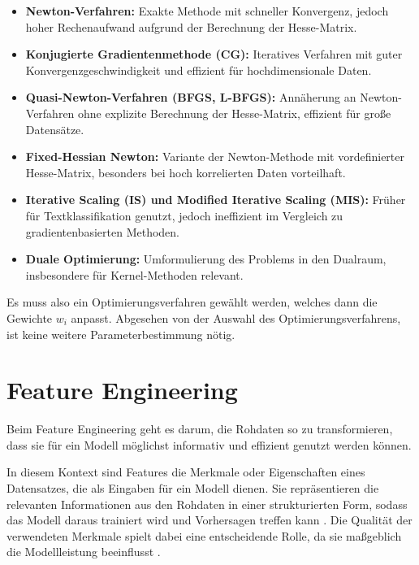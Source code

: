 \begin{itemize}[noitemsep]
    \item \textbf{Newton-Verfahren:} Exakte Methode mit schneller Konvergenz, jedoch hoher Rechenaufwand aufgrund der Berechnung der Hesse-Matrix.
    \item \textbf{Konjugierte Gradientenmethode (CG):} Iteratives Verfahren mit guter Konvergenzgeschwindigkeit und effizient für hochdimensionale Daten.
    \item \textbf{Quasi-Newton-Verfahren (BFGS, L-BFGS):} Annäherung an Newton-Verfahren ohne explizite Berechnung der Hesse-Matrix, effizient für große Datensätze.
    \item \textbf{Fixed-Hessian Newton:} Variante der Newton-Methode mit vordefinierter Hesse-Matrix, besonders bei hoch korrelierten Daten vorteilhaft.
    \item \textbf{Iterative Scaling (IS) und Modified Iterative Scaling (MIS):} Früher für Textklassifikation genutzt, jedoch ineffizient im Vergleich zu gradientenbasierten Methoden.
    \item \textbf{Duale Optimierung:} Umformulierung des Problems in den Dualraum, insbesondere für Kernel-Methoden relevant.
\end{itemize}

Es muss also ein Optimierungsverfahren gewählt werden, welches dann die Gewichte \(w_i\) anpasst.
Abgesehen von der Auswahl des Optimierungsverfahrens, ist keine weitere Parameterbestimmung nötig.

\section{Feature Engineering}
\label{sec:feature_engeneering}


Beim Feature Engineering geht es darum, die Rohdaten so zu transformieren, dass sie für ein Modell möglichst informativ und effizient genutzt werden können.

In diesem Kontext sind Features die Merkmale oder Eigenschaften eines Datensatzes, die als Eingaben für ein Modell dienen. Sie repräsentieren die relevanten Informationen aus den Rohdaten in einer strukturierten Form, sodass das Modell daraus trainiert wird und Vorhersagen treffen kann \cite{Bishop2006}.
Die Qualität der verwendeten Merkmale spielt dabei eine entscheidende Rolle, da sie maßgeblich die Modellleistung beeinflusst \cite{Hastie2009}. 

